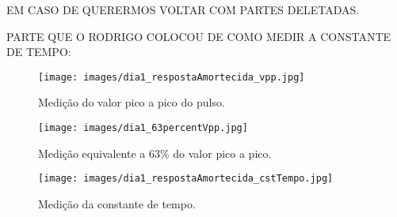 EM CASO DE QUERERMOS VOLTAR COM PARTES DELETADAS.

PARTE QUE O RODRIGO COLOCOU DE COMO MEDIR A CONSTANTE DE TEMPO:

\begin{figure}[H]
  \centering
	\texttt{[image: images/dia1\_respostaAmortecida\_vpp.jpg]}
\caption{Medição do valor pico a pico do pulso.}
\label{fig:dia1-1ordem-vpp}
\end{figure}

\begin{figure}[H]
  \centering
	\texttt{[image: images/dia1\_63percentVpp.jpg]}
\caption{Medição equivalente a 63\% do valor pico a pico.}
\label{fig:dia1-1ordem-063Vpp}
\end{figure}

\begin{figure}[H]
  \centering
	\texttt{[image: images/dia1\_respostaAmortecida\_cstTempo.jpg]}
\caption{Medição da constante de tempo.}
\label{fig:dia1-1ordem-cteTempo}
\end{figure}
